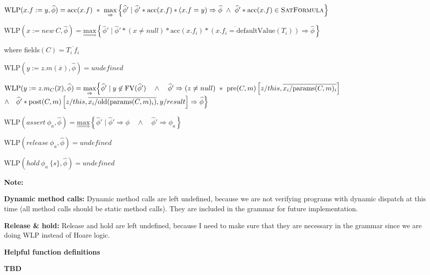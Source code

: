 \documentclass {article}
\newcommand{\fphi}{\widehat{\phi}}
\newcommand{\acc}[1]{\text{acc}(#1)}
\newcommand{\imp}{\Rightarrow}
\newcommand{\maximp}[2]{\underset{\Rightarrow}{\text{max}}\left\{#1 \mid #2\right\}}
\newcommand{\wlp}[2]{\text{WLP}(#1,#2)}
\newcommand{\satdef}{\textsc{SatFormula}}
\begin{document}
$\wlp{x.f := y}{\fphi} = \acc{x.f} \ \ast \ \maximp{\fphi'}{\fphi' \ast \acc{x.f} \ast (x.f = y) \imp \fphi \ \wedge \ \fphi' * \acc{x.f} \in \satdef} $

\vspace{0.5cm}

$\wlp{x := new\ C}{\fphi} = \maximp{\fphi'}{ \fphi' \ast (x \neq null) \ast \overline{\acc{x.f_i} \ast (x.f_i = \text{defaultValue}(T_i))} \imp \fphi}$ 

\indent  \hspace{4cm} where fields$(C) = \overline{T_i \ f_i}$

\vspace{0.5cm}

$\wlp{y := z.m(\overline{x})}{\fphi} = undefined$

\vspace{0.5cm}

$\wlp{y := z.m_C(\overline{x})}{\fphi} = \underset{\Rightarrow}{\text{max}} \Big{\{} \fphi' \mid y \not \in \text{FV}(\fphi') \quad \wedge \quad \fphi' \imp (z \neq null) \ \ast \ \text{pre}(C,m)\left[z/this, \overline{x_i/\text{params}(C,m)_i}\right] $ 
\indent \hspace{4cm} $ \wedge \quad \fphi' \ast \text{post}(C,m)\left[z/this, \overline{x_i/\text{old}(\text{params}(C,m)_i)}, y/result \right] \imp \fphi \Big{\}}$

\vspace{0.5cm}

$\wlp{assert\ \phi_a}{\fphi} = \maximp{\fphi'}{\fphi' \imp \fphi \quad \wedge \quad \fphi' \imp \phi_a} $

\vspace{0.5cm}

$\wlp{release \ \phi_a}{\fphi} = undefined $

\vspace{0.5cm}

$\wlp{hold \ \phi_a \ \{s\}}{\fphi} = undefined $

\vspace{0.5cm}

\noindent \textbf{Note:} 

\textbf{Dynamic method calls:} Dynamic method calls are left undefined, because we are not verifying programs with dynamic dispatch at this time (all method calls should be static method calls). They are included in the grammar for future implementation.

\textbf{Release \& hold:} Release and hold are left undefined, because I need to make sure that they are necessary in the grammar since we are doing WLP instead of Hoare logic.

\begin{center}
\textbf{Helpful function definitions}
\end{center}

\textbf{TBD}
\end{document}
